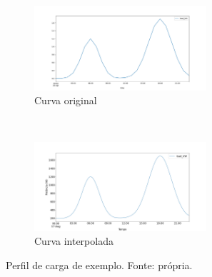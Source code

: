 
\begin{figure}[H]
	\centering
	\begin{subfigure}[b]{\textwidth}
		\centering
		\includegraphics[width=0.7\textwidth]{../img/load.png}
		\caption{Curva original}\label{fig:load}
	\end{subfigure}
	\\ \vspace{0.1cm}
	\begin{subfigure}[b]{\textwidth}
		\centering
		\includegraphics[width=0.7\textwidth]{../img/load_corr.png}
		\caption{Curva interpolada}\label{fig:load_corr}
	\end{subfigure}
	\caption{Perfil de carga de exemplo. Fonte: própria.}\label{fig:perfil}
\end{figure}
